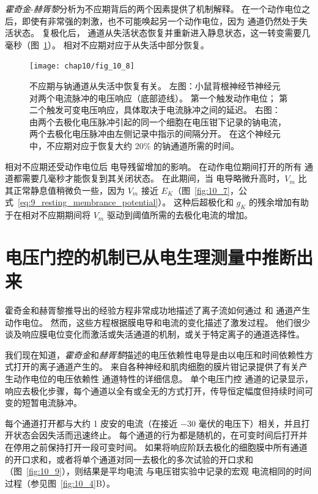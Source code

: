 \textit{霍奇金}-\textit{赫胥黎}分析为不应期背后的两个因素提供了机制解释。
在一个动作电位之后，即使有非常强的刺激，也不可能唤起另一个动作电位，因为  通道仍然处于失活状态。
复极化后， 通道从失活状态恢复并重新进入静息状态，这一转变需要几毫秒（图~\ref{fig:10_8}）。
相对不应期对应于从失活中部分恢复。


\begin{figure}[htbp]
	\centering
	\texttt{[image: chap10/fig\_10\_8]}
	\caption{不应期与钠通道从失活中恢复有关。
		左图：小鼠背根神经节神经元对两个电流脉冲的电压响应（底部迹线）。
		第一个触发动作电位；
		第二个触发可变电压响应，具体取决于电流脉冲之间的延迟。
		右图：由两个去极化电压脉冲引起的同一个细胞在电压钳下记录的钠电流，两个去极化电压脉冲由左侧记录中指示的间隔分开。
		在这个神经元中，不应期对应于恢复大约 20\% 的钠通道所需的时间。}
	\label{fig:10_8}
\end{figure}


相对不应期还受动作电位后  电导残留增加的影响。
在动作电位期间打开的所有  通道都需要几毫秒才能恢复到其关闭状态。
在此期间，当  电导略微升高时，$V_m$ 比其正常静息值稍微负一些，因为 $V_m$ 接近 $E_K$（图~\ref{fig:10_7}，公式~\ref{eq:9_resting_membrance_potential}）。
这种后超极化和 $g_K$ 的残余增加有助于在相对不应期期间将 $V_m$ 驱动到阈值所需的去极化电流的增加。




\section{电压门控的机制已从电生理测量中推断出来}

霍奇金和赫胥黎推导出的经验方程非常成功地描述了离子流如何通过  和  通道产生动作电位。
然而，这些方程根据膜电导和电流的变化描述了激发过程。
他们很少谈及响应膜电位变化而激活或失活通道的机制，或关于特定离子的通道选择性。


我们现在知道，\textit{霍奇金}和\textit{赫胥黎}描述的电压依赖性电导是由以电压和时间依赖性方式打开的离子通道产生的。
来自各种神经和肌肉细胞的膜片钳记录提供了有关产生动作电位的电压依赖性  通道特性的详细信息。
单个电压门控  通道的记录显示，响应去极化步骤，每个通道以全有或全无的方式打开，传导恒定幅度但持续时间可变的短暂电流脉冲。


每个通道打开都与大约 1 皮安的电流（在接近 −30 毫伏的电压下）相关，并且打开状态会因失活而迅速终止。 
每个通道的行为都是随机的，在可变时间后打开并在停用之前保持打开一段可变时间。
如果将响应阶跃去极化的细胞膜中所有通道的开口求和，或者将单个通道对同一去极化的多次试验的开口求和（图~\ref{fig:10_9}），则结果是平均电流 与电压钳实验中记录的宏观  电流相同的时间过程（参见图~\ref{fig:10_4}B）。


